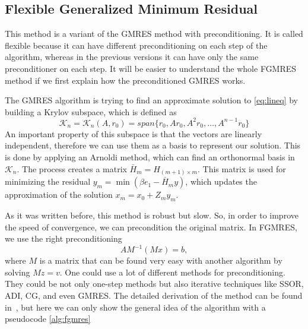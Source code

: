 \subsection{Flexible Generalized Minimum Residual}

This method is a variant of the GMRES method with preconditioning. It is called flexible because it can have different preconditioning on each step of the algorithm, whereas in the previous versions it can have only the same preconditioner on each step. It will be easier to understand the whole FGMRES method if we first explain how the preconditioned GMRES works.

The GMRES algorithm is trying to find an approximate solution to \cref{eq:lineq} by building a Krylov subspace, which is defined as
\begin{equation}
    \mathcal{K}_n = \mathcal{K}_n (A, r_0) = span \{ r_0, Ar_0, A^2r_0,\hdots, A^{n-1}r_0 \}
\end{equation}
An important property of this subspace is that the vectors are linearly independent, therefore we can use them as a basis to represent our solution. This is done by applying an Arnoldi method, which can find an orthonormal basis in $\mathcal{K}_n$. The process creates a matrix $\bar{H}_m = H_{(m+1)\times m}$. This matrix is used for minimizing the residual $y_m = \min(\beta e_1 - \bar{H}_m y)$, which updates the approximation of the solution $x_m = x_0 + Z_my_m$.

As it was written before, this method is robust but slow. So, in order to improve the speed of convergence, we can precondition the original matrix. In FGMRES, we use the right preconditioning
\begin{equation}
    AM^{-1}(Mx) = b,
\end{equation}
where $M$ is a matrix that can be found very easy with another algorithm by solving $Mz = v$. One could use a lot of different methods for preconditioning. They could be not only one-step methods but also iterative techniques like SSOR, ADI, CG, and even GMRES. The detailed derivation of the method can be found in~\cite{fgmresart}, but here we can only show the general idea of the algorithm with a pseudocode \cref{alg:fgmres}


